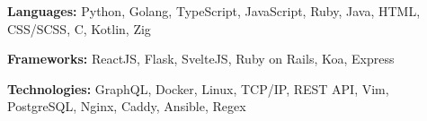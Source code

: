 \textbf{Languages:} Python,  Golang, TypeScript, JavaScript, Ruby, Java, HTML, CSS\slash SCSS, C, Kotlin, Zig

\vspace{0.2cm}

\textbf{Frameworks:} ReactJS, Flask, SvelteJS, Ruby on Rails, Koa, Express

\vspace{0.2cm}

\textbf{Technologies:} GraphQL, Docker, Linux, TCP/IP, REST API, Vim, PostgreSQL, Nginx, Caddy, Ansible, Regex
